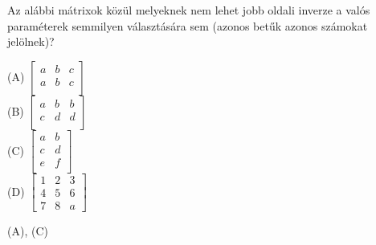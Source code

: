 \begin{frame}
  \begin{tcolorbox}[title={6/8. {\symqueen}}]
     Az alábbi mátrixok közül melyeknek nem lehet jobb oldali inverze a valós paraméterek semmilyen választására sem (azonos betűk azonos számokat jelölnek)? 
     
    (A) $\begin{bmatrix} 
  				a & b & c \\
  				a & b & c \\
			\end{bmatrix}$\\
	(B) $\begin{bmatrix} 
  				a & b & b \\
  				c & d & d \\
			\end{bmatrix}$\\
	(C) $\begin{bmatrix} 
  				a & b \\
  				c & d \\
  				e & f \\
			\end{bmatrix}$\\
	(D) $\begin{bmatrix} 
  				1 & 2 & 3 \\
  				4 & 5 & 6 \\
  				7 & 8 & a
			\end{bmatrix}$
  \tcblower

    \mmedskip 
    
     (A), (C)
  \end{tcolorbox}
\end{frame}


